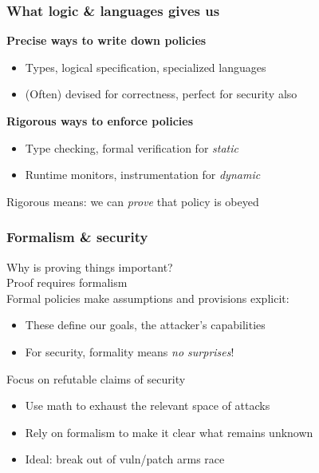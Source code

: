 \documentclass[10pt]{beamer}
\begin{document}

\begin{frame}

\frametitle{What logic \& languages gives us}

\textbf{Precise ways to write down policies} \pause
\begin{itemize}
  \item Types, logical specification, specialized languages
  \item (Often) devised for correctness, perfect for security also \\[1em]
\end{itemize}

\pause
\textbf{Rigorous ways to enforce policies}
\begin{itemize}
  \item Type checking, formal verification for \emph{static}
  \item Runtime monitors, instrumentation for \emph{dynamic} \\[1em]
\end{itemize}

\pause
Rigorous means: we can \emph{prove} that policy is obeyed

\end{frame}


\begin{frame}

\frametitle{Formalism \& security}

Why is proving things important?
\\[1em]

\pause
Proof requires formalism
\\[1em]

\pause
Formal policies make assumptions and provisions explicit:
\begin{itemize}
  \item These define our goals, the attacker's capabilities
  \item For security, formality means \emph{no surprises}! \\[1em]
\end{itemize}

\pause
Focus on refutable claims of security
\begin{itemize}
  \item Use math to exhaust the relevant space of attacks
  \item Rely on formalism to make it clear what remains unknown
  \item Ideal: break out of vuln/patch arms race \\[1em]
\end{itemize}


\end{frame}
\end{document}
